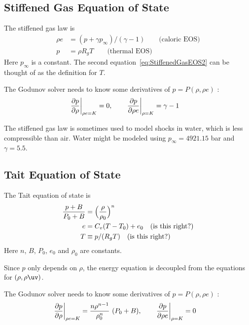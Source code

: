 \documentclass{article}
\begin{document}
\subsection{Stiffened Gas Equation of State}


The stiffened gas law is
\begin{align}
 \rho e & =  (p + \gamma p_\infty)/(\gamma-1) \qquad\mbox{(caloric EOS)}\label{eq:StiffenedGasEOS1} \\
 p & = \rho R_g T               \qquad\mbox{(thermal EOS)}\label{eq:StiffenedGasEOS2}
\end{align}
Here $p_\infty$ is a constant. 
The second equation~\eqref{eq:StiffenedGasEOS2} can be thought of as the definition for $T$.

The Godunov solver needs to know some derivatives of $p=P(\rho,\rho e)$ :
\begin{align}
 \left.{\partial p \over \partial \rho}\right\vert_{\rho e =K} &= 0, \qquad
 \left.{\partial p \over \partial \rho e}\right\vert_{\rho=K} = \gamma-1 
\end{align}


The stiffened gas law is sometimes used to model shocks in water, which is less compressible than air.
Water might be modeled using $p_\infty = 4921.15$ bar and $\gamma = 5.5$. 


\subsection{Tait Equation of State}

The Tait equation of state is
\begin{align}
 { p + B \over P_0 + B} &= \Big(\frac{\rho}{\rho_0}\Big)^n \\
 e & =C_v (T-T_0)+e_0 ~~~\mbox{(is this right?)} \\
  T &\equiv p/(R_g T) ~~~\mbox{(is this right?)}
\end{align}
Here $n$, $B$, $P_0$, $e_0$ and $\rho_0$ are constants.

Since $p$ only depends on $\rho$, the energy equation is decoupled from the equations for $(\rho,\rho\uv)$.

The Godunov solver needs to know some derivatives of $p=P(\rho,\rho e)$ :
\begin{align}
 \left.{\partial p \over \partial \rho}\right\vert_{\rho e =K} &=  { n\rho^{n-1} \over \rho_0^n} ~(P_0 + B), \qquad
 \left.{\partial p \over \partial \rho e}\right\vert_{\rho=K} = 0
\end{align}
\end{document}
